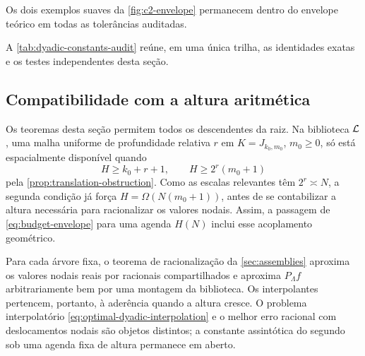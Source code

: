 Os dois exemplos suaves da \cref{fig:c2-envelope} permanecem dentro do
envelope teórico em todas as tolerâncias auditadas.

\begin{table}[t]
 \centering
 \caption{Auditoria executável das constantes diádicas.}
 \label{tab:dyadic-constants-audit}
 \small
 
\end{table}

A \cref{tab:dyadic-constants-audit} reúne, em uma única trilha, as
identidades exatas e os testes independentes desta seção.

\subsection{Compatibilidade com a altura aritmética}

Os teoremas desta seção permitem todos os descendentes da raiz. Na biblioteca
$\mathcal{L}$, uma malha uniforme de profundidade relativa $r$ em
$K=J_{k_0,m_0}$, $m_0\ge0$, só está espacialmente disponível quando
\[
 H\ge k_0+r+1,
 \qquad H\ge2^r(m_0+1)
\]
pela \cref{prop:translation-obstruction}. Como as escalas relevantes têm
$2^r\asymp N$, a segunda condição já força $H=\Omega(N(m_0+1))$, antes de
se contabilizar a altura necessária para racionalizar os valores nodais.
Assim, a passagem de \eqref{eq:budget-envelope} para uma agenda $H(N)$ inclui
esse acoplamento geométrico.

Para cada árvore fixa, o teorema de racionalização da \cref{sec:assemblies}
aproxima os valores nodais reais por racionais compartilhados e aproxima
$P_\Lambda f$ arbitrariamente bem por uma montagem da biblioteca. Os
interpolantes pertencem, portanto, à aderência quando a altura cresce. O
problema interpolatório \eqref{eq:optimal-dyadic-interpolation} e o melhor
erro racional com deslocamentos nodais são objetos distintos; a constante
assintótica do segundo sob uma agenda fixa de altura permanece em aberto.
